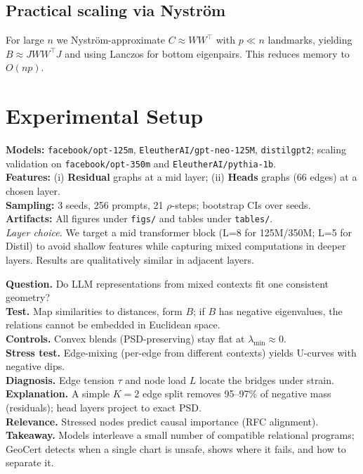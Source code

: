 \documentclass[11pt]{article}
\newcommand{\1}{\mathbf{1}}
\begin{document}
\subsection{Practical scaling via Nyström}\label{sec:nystrom}
For large $n$ we Nyström-approximate $C\approx W W^\top$ with $p\ll n$ landmarks, yielding $B\approx J W W^\top J$ and using Lanczos for bottom eigenpairs. This reduces memory to $O(np)$.

\section{Experimental Setup}
\textbf{Models:} \texttt{facebook/opt-125m}, \texttt{EleutherAI/gpt-neo-125M}, \texttt{distilgpt2}; scaling validation on \texttt{facebook/opt-350m} and \texttt{EleutherAI/pythia-1b}.\\
\textbf{Features:} (i) \textbf{Residual} graphs at a mid layer; (ii) \textbf{Heads} graphs (66 edges) at a chosen layer.\\
\textbf{Sampling:} 3 seeds, 256 prompts, 21 $\rho$-steps; bootstrap CIs over seeds.\\
\textbf{Artifacts:} All figures under \texttt{figs/} and tables under \texttt{tables/}.\\[0.25em]
\textit{Layer choice.} We target a mid transformer block (L=8 for 125M/350M; L=5 for Distil) to avoid shallow features while capturing mixed computations in deeper layers. Results are qualitatively similar in adjacent layers.

\begin{tcolorbox}[title=Executive Summary]
\textbf{Question.} Do LLM representations from mixed contexts fit one consistent geometry? \\
\textbf{Test.} Map similarities to distances, form $B$; if $B$ has negative eigenvalues, the relations cannot be embedded in Euclidean space. \\
\textbf{Controls.} Convex blends (PSD-preserving) stay flat at $\lambda_{\min}\!\approx\!0$. \\
\textbf{Stress test.} Edge-mixing (per-edge from different contexts) yields U-curves with negative dips. \\
\textbf{Diagnosis.} Edge tension $\tau$ and node load $L$ locate the bridges under strain. \\
\textbf{Explanation.} A simple $K{=}2$ edge split removes 95--97\% of negative mass (residuals); head layers project to exact PSD. \\
\textbf{Relevance.} Stressed nodes predict causal importance (RFC alignment). \\
\textbf{Takeaway.} Models interleave a small number of compatible relational programs; GeoCert detects when a single chart is unsafe, shows where it fails, and how to separate it.
\end{tcolorbox}
\end{document}
